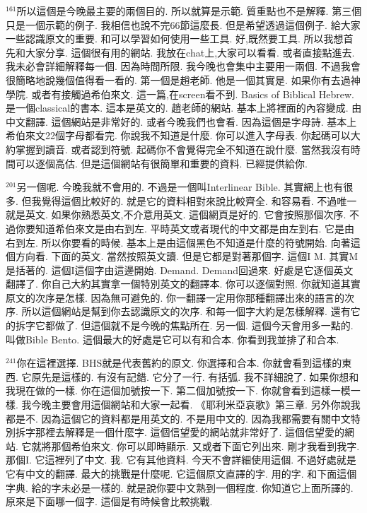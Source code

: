 \documentclass{book}
\begin{document}
$^{161}$所以這個是今晚最主要的兩個目的.
所以就算是示範.
質重點也不是解釋.
第三個只是一個示範的例子.
我相信也說不完66節這麼長.
但是希望透過這個例子.
給大家一些認識原文的重要.
和可以學習如何使用一些工具.
好,既然要工具.
所以我想首先和大家分享.
這個很有用的網站.
我放在chat上,大家可以看看.
或者直接點進去.
我未必會詳細解釋每一個.
因為時間所限.
我今晚也會集中主要用一兩個.
不過我會很簡略地說幾個值得看一看的.
第一個是趙老師.
他是一個其實是.
如果你有去過神學院.
或者有接觸過希伯來文.
這一篇,在screen看不到.
Basics of Biblical Hebrew.
是一個classical的書本.
這本是英文的.
趙老師的網站.
基本上將裡面的內容變成.
由中文翻譯.
這個網站是非常好的.
或者今晚我們也會看.
因為這個是字母詩.
基本上希伯來文22個字母都看完.
你說我不知道是什麼.
你可以進入字母表.
你起碼可以大約掌握到讀音.
或者認到符號.
起碼你不會覺得完全不知道在說什麼.
當然我沒有時間可以逐個高估.
但是這個網站有很簡單和重要的資料.
已經提供給你.

$^{201}$另一個呢.
今晚我就不會用的.
不過是一個叫Interlinear Bible.
其實網上也有很多.
但我覺得這個比較好的.
就是它的資料相對來說比較齊全.
和容易看.
不過唯一就是英文.
如果你熟悉英文,不介意用英文.
這個網頁是好的.
它會按照那個次序.
不過你要知道希伯來文是由右到左.
平時英文或者現代的中文都是由左到右.
它是由右到左.
所以你要看的時候.
基本上是由這個黑色不知道是什麼的符號開始.
向著這個方向看.
下面的英文.
當然按照英文讀.
但是它都是對著那個字.
這個I M.
其實M是括著的.
這個I這個字由這邊開始.
Demand.
Demand回過來.
好處是它逐個英文翻譯了.
你自己大約其實拿一個特別英文的翻譯本.
你可以逐個對照.
你就知道其實原文的次序是怎樣.
因為無可避免的.
你一翻譯一定用你那種翻譯出來的語言的次序.
所以這個網站是幫到你去認識原文的次序.
和每一個字大約是怎樣解釋.
還有它的拆字它都做了.
但這個就不是今晚的焦點所在.
另一個.
這個今天會用多一點的.
叫做Bible Bento.
這個最大的好處是它可以有和合本.
你看到我並排了和合本.

$^{241}$你在這裡選擇.
BHS就是代表舊約的原文.
你選擇和合本.
你就會看到這樣的東西.
它原先是這樣的.
有沒有記錯.
它分了一行.
有括弧.
我不詳細說了.
如果你想和我現在做的一樣.
你在這個加號按一下.
第二個加號按一下.
你就會看到這樣一模一樣.
我今晚主要會用這個網站和大家一起看.
《耶利米亞哀歌》第三章.
另外你說我都是不.
因為這個它的資料都是用英文的.
不是用中文的.
因為我都需要有關中文特別拆字那裡去解釋是一個什麼字.
這個信望愛的網站就非常好了.
這個信望愛的網站.
它就將那個希伯來文.
你可以即時顯示.
又或者下面它列出來.
剛才我看到我字.
那個I.
它這裡列了中文.
我.
它有其他資料.
今天不會詳細使用這個.
不過好處就是它有中文的翻譯.
最大的挑戰是什麼呢.
它這個原文直譯的字.
用的字.
和下面這個字典.
給的字未必是一樣的.
就是說你要中文熟到一個程度.
你知道它上面所譯的.
原來是下面哪一個字.
這個是有時候會比較挑戰.
\end{document}
